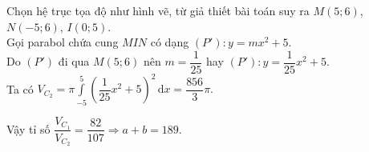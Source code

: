 \begin{ex}
{\begin{itemize}
\begin{center}
\end{center}
Chọn hệ trục tọa độ như hình vẽ, từ giả thiết bài toán suy ra $M(5;6)$, $N(-5;6)$, $I(0;5)$.\\
Gọi parabol chứa cung $MIN$ có dạng $(P')\colon y=mx^2+5$.\\
Do $(P')$ đi qua $M(5;6)$ nên $m=\dfrac{1}{25}$ hay $(P')\colon y=\dfrac{1}{25}x^2+5$.\\
Ta có $V_{C_2}=\pi\displaystyle\int\limits_{-5}^5 \left(\dfrac{1}{25}x^2+5\right)^2 \mathrm{\,d}x=\dfrac{856}{3}\pi.$
\end{itemize}
Vậy tỉ số $\dfrac{V_{C_1}}{V_{C_2}}=\dfrac{82}{107}\Rightarrow a+b=189$.
}
\end{ex}

